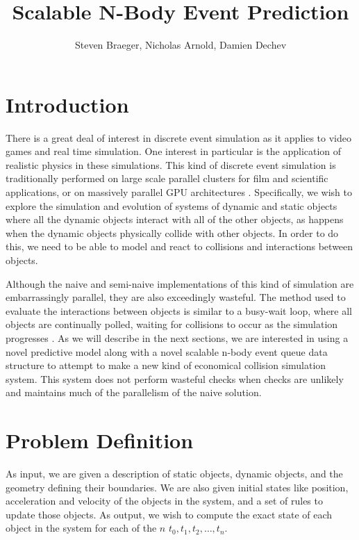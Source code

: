 \documentclass[CEJCS,PDF]{cej} %
\title{Scalable N-Body Event Prediction}
\author{Steven Braeger\inst{1}\email{steve@soapforge.com},
        Nicholas Arnold\inst{1}\email{narnold@knights.ucf.edu},
        Damien Dechev\inst{1}\email{damian.dechev@gmail.com}}
\institute{
     \inst{1} University of Central Florida,\\
     4000 Central Florida Blvd., 32816 Orlando, Florida, USA
          }
\begin{document}
\maketitle



\section{Introduction}

There is a great deal of interest in discrete event simulation as it applies to video games and real time simulation. One interest in particular is the application of realistic physics in these simulations.  This kind of discrete event simulation is traditionally performed on large scale parallel clusters for film and scientific applications, or on massively parallel GPU architectures \cite{grape,uberflow}.  Specifically, we wish to explore the simulation and evolution of systems of dynamic and static objects where all the dynamic objects interact with all of the other objects, as happens when the dynamic objects physically collide with other objects.  In order to do this, we need to be able to model and react to collisions and interactions between objects. 

Although the naive and semi-naive implementations of this kind of simulation are embarrassingly parallel, they are also exceedingly wasteful.  The method used to evaluate the interactions between objects is similar to a busy-wait loop, where all objects are continually polled, waiting for collisions to occur as the simulation progresses \cite{nbodycollisions,Moore88collisiondetection}.   As we will describe in the next sections, we are interested in using a novel predictive model along with a novel scalable n-body event queue data structure to attempt to make a new kind of economical collision simulation system.  This system does not perform wasteful checks when checks are unlikely and maintains much of the parallelism of the naive solution.

\section{Problem Definition}

As input, we are given a description of static objects, dynamic objects, and the geometry defining their boundaries.  We are also given initial states like position, acceleration and velocity of the objects in the system, and a set of rules to update those objects.  As output, we wish to compute the exact state of each object in the system for each of the $n$  $t_0, t_1, t_2, \ldots, t_n$.
\end{document}
